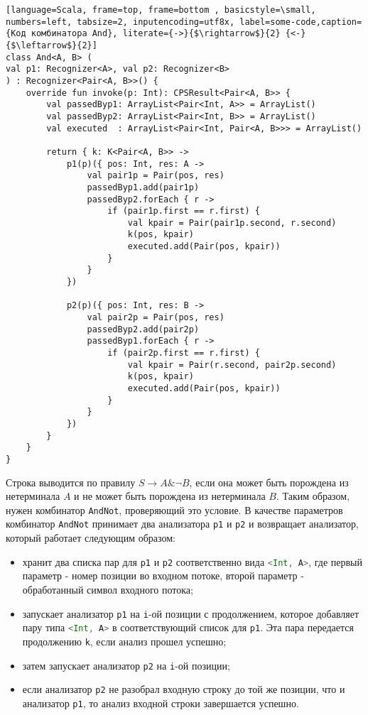 \documentclass[14pt]{matmex-diploma}
\begin{document}
\begin{lstlisting}[language=Scala, frame=top, frame=bottom , basicstyle=\small, numbers=left, tabsize=2, inputencoding=utf8x, label=some-code,caption={Код комбинатора And}, literate={->}{$\rightarrow$}{2} {<-}{$\leftarrow$}{2}]
class And<A, B> (
val p1: Recognizer<A>, val p2: Recognizer<B>
) : Recognizer<Pair<A, B>>() {
    override fun invoke(p: Int): CPSResult<Pair<A, B>> {
        val passedByp1: ArrayList<Pair<Int, A>> = ArrayList()
        val passedByp2: ArrayList<Pair<Int, B>> = ArrayList()
        val executed  : ArrayList<Pair<Int, Pair<A, B>>> = ArrayList()

        return { k: K<Pair<A, B>> ->
            p1(p)({ pos: Int, res: A ->
                val pair1p = Pair(pos, res)
                passedByp1.add(pair1p)
                passedByp2.forEach { r ->
                    if (pair1p.first == r.first) {
                        val kpair = Pair(pair1p.second, r.second)
                        k(pos, kpair)
                        executed.add(Pair(pos, kpair))
                    }
                }
            })

            p2(p)({ pos: Int, res: B ->
                val pair2p = Pair(pos, res)
                passedByp2.add(pair2p)
                passedByp1.forEach { r ->
                    if (pair2p.first == r.first) {
                        val kpair = Pair(r.second, pair2p.second)
                        k(pos, kpair)
                        executed.add(Pair(pos, kpair))
                    }
                }
            })
        }
    }
}
\end{lstlisting}
Строка выводится по правилу $S \rightarrow A \& \neg B$, если она может быть порождена из нетерминала $A$ и не может быть порождена из нетерминала $B$. Таким образом, нужен комбинатор \lstinline[language=Scala]{AndNot}, проверяющий это условие.
В качестве параметров комбинатор \lstinline[language=Scala]{AndNot} принимает два анализатора \lstinline[language=Scala]{p1} и \lstinline[language=Scala]{p2} и возвращает анализатор, который работает следующим образом:
\begin{itemize}
    \item хранит два списка пар  для \lstinline[language=Scala]{p1} и \lstinline[language=Scala]{p2} соответственно вида \lstinline[language=Scala]{<Int, A>}, где первый параметр - номер позиции во входном потоке, второй параметр - обработанный символ входного потока;
    \item запускает анализатор \lstinline[language=Scala]{p1} на \lstinline[language=Scala]{i}-ой позиции с продолжением, которое добавляет пару типа \lstinline[language=Scala]{<Int, A>} в соответствующий список для \lstinline[language=Scala]{p1}. Эта пара передается продолжению \lstinline[language=Scala]{k}, если анализ прошел успешно;
    \item затем запускает анализатор \lstinline[language=Scala]{p2} на \lstinline[language=Scala]{i}-ой позиции;
    \item если анализатор \lstinline[language=Scala]{p2} не разобрал входную строку до той же позиции, что и анализатор \lstinline[language=Scala]{p1}, то анализ входной строки завершается успешно.
\end{itemize}
\end{document}
